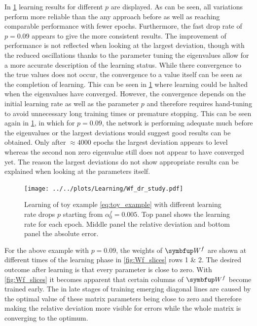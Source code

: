 In \cref{fig:dr_fast_study} learning results for different $p$ are displayed. As can be seen, all variations perform more reliable than the any approach before as well as reaching comparable performance with fewer epochs. Furthermore, the fast drop rate of $p = 0.09$ appears to give the more consistent results. The improvement of performance is not reflected when looking at the largest deviation, though with the reduced oscillations thanks to the parameter tuning the eigenvalues allow for a more accurate description of the learning status. While there convergence to the true values does not occur, the convergence to a value itself can be seen as the completion of learning. This can be seen in \cref{fig:dr_fast_study} where learning could be halted when the eigenvalues have converged. However, the convergence depends on the initial learning rate as well as the parameter $p$ and therefore requires hand-tuning to avoid unnecessary long training times or premature stopping. This can be seen again in \cref{fig:dr_fast_study}, in which for $p = 0.09$, the network is performing adequate much before the eigenvalues or the largest deviations would suggest good results can be obtained. Only after $\approx 4000$ epochs the largest deviation appears to level whereas the second non zero eigenvalue still does not appear to have converged yet. The reason the largest deviations do not show appropriate results can be explained when looking at the parameters itself.\\
\begin{figure}
	\centering
	\texttt{[image: ../../plots/Learning/Wf\_dr\_study.pdf]}
	\caption{Learning of toy example \cref{eq:toy_example} with different learning rate drops $p$ starting from $\alpha^f_0 = 0.005$. Top panel shows the learning rate for each epoch. Middle panel the relative deviation and bottom panel the absolute error.}
	\label{fig:dr_fast_study}
\end{figure}
For the above example with $p = 0.09$, the weights of $\bmu{W}^f$ are shown at different times of the learning phase in \cref{fig:Wf_slices} rows 1 \& 2. The desired outcome after learning is that every parameter is close to zero. With \cref{fig:Wf_slices} it becomes apparent that certain columns of $\bmu{W}^f$ become trained early. The in late stages of training emerging diagonal lines are caused by the optimal value of these matrix parameters being close to zero and therefore making the relative deviation more visible for errors while the whole matrix is converging to the optimum.\\
